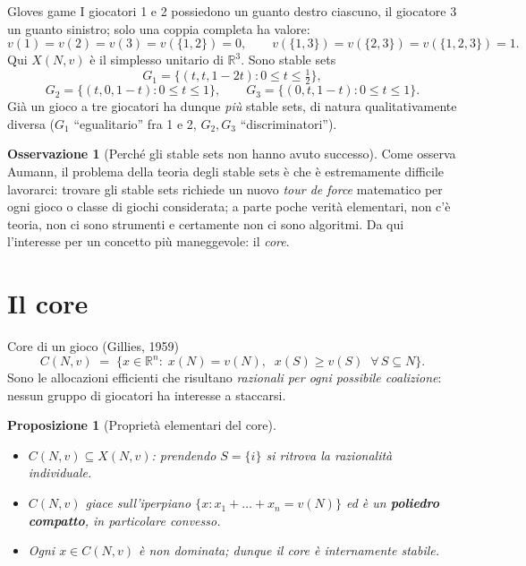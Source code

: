 \documentclass[12pt,a4paper,twoside]{book}
\theoremstyle{plain}
\newtheorem{proposition}[theorem]{Proposizione}
\theoremstyle{definition}
\newtheorem{remark}[theorem]{Osservazione}
\begin{document}
\begin{exbox}{Gloves game}
I giocatori 1 e 2 possiedono un guanto destro ciascuno, il giocatore 3 un guanto
sinistro; solo una coppia completa ha valore:
\[
  v(1)=v(2)=v(3)=v(\{1,2\})=0,\qquad
  v(\{1,3\})=v(\{2,3\})=v(\{1,2,3\})=1 .
\]
Qui $X(N,v)$ è il simplesso unitario di $\mathbb{R}^3$. Sono stable sets
\[
  G_1=\{(t,t,1-2t):0\le t\le \tfrac12\},
\]
\[
  G_2=\{(t,0,1-t):0\le t\le 1\},\qquad
  G_3=\{(0,t,1-t):0\le t\le 1\}.
\]
Già un gioco a tre giocatori ha dunque \emph{più} stable sets, di natura
qualitativamente diversa ($G_1$ ``egualitario'' fra 1 e 2, $G_2,G_3$
``discriminatori'').
\end{exbox}

\begin{remark}[Perché gli stable sets non hanno avuto successo]
Come osserva Aumann, il problema della teoria degli stable sets è che è
estremamente difficile lavorarci: trovare gli stable sets richiede un nuovo
\emph{tour de force} matematico per ogni gioco o classe di giochi considerata; a
parte poche verità elementari, non c'è teoria, non ci sono strumenti e
certamente non ci sono algoritmi. Da qui l'interesse per un concetto più
maneggevole: il \emph{core}.
\end{remark}

\section{Il core}

\begin{defbox}{Core di un gioco (Gillies, 1959)}
\[
  C(N,v)\;=\;\bigl\{x\in\mathbb{R}^n:\;x(N)=v(N),\;\;x(S)\ge v(S)\;\;\forall\,S\subseteq N\bigr\}.
\]
Sono le allocazioni efficienti che risultano \emph{razionali per ogni possibile
coalizione}: nessun gruppo di giocatori ha interesse a staccarsi.
\end{defbox}

\begin{proposition}[Proprietà elementari del core]
\begin{itemize}
  \item[(i)] $C(N,v)\subseteq X(N,v)$: prendendo $S=\{i\}$ si ritrova la razionalità individuale.
  \item[(ii)] $C(N,v)$ giace sull'iperpiano $\{x:x_1+\dots+x_n=v(N)\}$ ed è un \textbf{poliedro compatto}, in particolare \emph{convesso}.
  \item[(iii)] Ogni $x\in C(N,v)$ è non dominata; dunque il core è internamente stabile.
\end{itemize}
\end{proposition}
\end{document}
